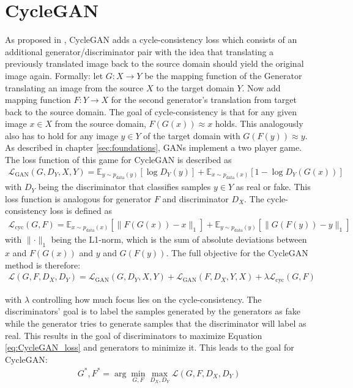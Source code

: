 \section{CycleGAN} 
As proposed in \cite{DBLP:journals/corr/ZhuPIE17}, CycleGAN adds a cycle-consistency loss which consists of an additional generator/discriminator pair with the idea that translating a previously translated image back to the source domain should yield the original image again. Formally: let $G: X \rightarrow Y$ be the mapping function of the Generator translating an image from the source $X$ to the target domain $Y$. Now add mapping function $F: Y \rightarrow X$ for the second generator's translation from target back to the source domain. The goal of cycle-consistency is that for any given image $x\in X$ from the source domain, $F(G(x)) \approx x$ holds. This analogously also has to hold for any image $y \in Y$ of the target domain with $G(F(y)) \approx y$. As described in chapter \ref{sec:foundations}, GANs implement a two player game. The loss function of this game for CycleGAN is described as
\begin{align}
	\mathcal{L}_{\text{GAN}}(G, D_Y, X, Y) = \mathbb{E}_{y\sim p_{\text{data}}(y)}[\log D_Y(y)] + \mathbb{E}_{x\sim p_{\text{data}}(x)}[1 - \log D_Y(G(x))]
\end{align}
with $D_Y$ being the discriminator that classifies samples $y \in Y$ as real or fake. This loss function is analogous for generator $F$ and discriminator $D_X$. The cycle-consistency loss is defined as
\begin{align}
	\mathcal{L}_{\text{cyc}}(G, F) =  \mathbb{E}_{x\sim p_{\text{data}}(x)} [\lVert F(G(x))- x \rVert_1] + \mathbb{E}_{y\sim p_{\text{data}}(y)} [\lVert G(F(y))- y \rVert_1] \label{eq:GAN_loss}
\end{align}
with $\lVert \cdot \rVert_1$ being the L1-norm, which is the sum of absolute deviations between $x$ and $F(G(x))$ and $y$ and $G(F(y))$. The full objective for the CycleGAN method is therefore:
\begin{align}
	\mathcal{L}(G,F,D_X,D_Y) = \mathcal{L}_{\text{GAN}}(G, D_Y, X, Y) + \mathcal{L}_{\text{GAN}}(F, D_X, Y, X) + \lambda \mathcal{L}_{\text{cyc}}(G, F) \label{eq:CycleGAN_loss}
\end{align}

with $\lambda$ controlling how much focus lies on the cycle-consistency. The discriminators' goal is to label the samples generated by the generators as fake while the generator tries to generate samples that the discriminator will label as real. This results in the goal of discriminators to maximize Equation \ref{eq:CycleGAN_loss} and generators to minimize it. This leads to the goal for CycleGAN: 
\begin{align}
	G^*, F^* = \arg \underset{G,F}{\min}\underset{D_X, D_Y}{\max} \mathcal{L}(G,F,D_X,D_Y) \label{eq:GAN_goal}
\end{align}

